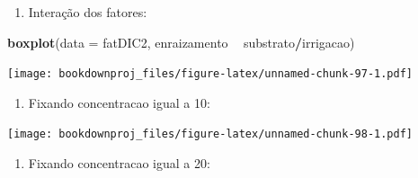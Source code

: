 \documentclass[
]{article}
\newenvironment{Shaded}{\begin{snugshade}}{\end{snugshade}}
\newcommand{\DataTypeTok}[1]{\textcolor[rgb]{0.13,0.29,0.53}{#1}}
\newcommand{\DecValTok}[1]{\textcolor[rgb]{0.00,0.00,0.81}{#1}}
\newcommand{\KeywordTok}[1]{\textcolor[rgb]{0.13,0.29,0.53}{\textbf{#1}}}
\newcommand{\NormalTok}[1]{#1}
\newcommand{\OperatorTok}[1]{\textcolor[rgb]{0.81,0.36,0.00}{\textbf{#1}}}
\newcommand{\StringTok}[1]{\textcolor[rgb]{0.31,0.60,0.02}{#1}}
\providecommand{\tightlist}{%
  \setlength{\itemsep}{0pt}\setlength{\parskip}{0pt}}
\begin{document}
\begin{enumerate}
\def\labelenumi{\arabic{enumi}.}
\setcounter{enumi}{2}
\tightlist
\item
  Interação dos fatores:
\end{enumerate}

\begin{Shaded}
\begin{Highlighting}[]
\KeywordTok{boxplot}\NormalTok{(}\DataTypeTok{data =}\NormalTok{ fatDIC2, enraizamento }\OperatorTok{~}\StringTok{ }\NormalTok{substrato}\OperatorTok{/}\NormalTok{irrigacao)}
\end{Highlighting}
\end{Shaded}

\texttt{[image: bookdownproj\_files/figure-latex/unnamed-chunk-97-1.pdf]}

\begin{enumerate}
\def\labelenumi{\arabic{enumi}.}
\setcounter{enumi}{3}
\tightlist
\item
  Fixando concentracao igual a 10:
\end{enumerate}

\begin{Shaded}
\end{Shaded}

\texttt{[image: bookdownproj\_files/figure-latex/unnamed-chunk-98-1.pdf]}

\begin{enumerate}
\def\labelenumi{\arabic{enumi}.}
\setcounter{enumi}{4}
\tightlist
\item
  Fixando concentracao igual a 20:
\end{enumerate}

\begin{Shaded}
\end{Shaded}
\end{document}
